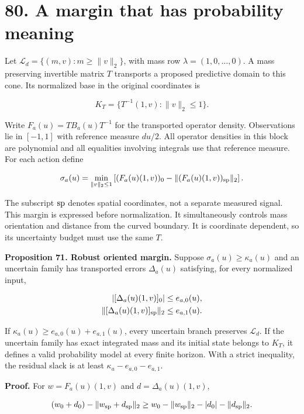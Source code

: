 \documentclass[11pt,letterpaper]{article}
\begin{document}
\section{80. A margin that has probability
meaning}\label{a-margin-that-has-probability-meaning}

Let \(\mathcal L_d=\{(m,v):m\geq\|v\|_2\}\), with mass row
\(\lambda=(1,0,\ldots,0)\). A mass preserving invertible matrix \(T\)
transports a proposed predictive domain to this cone. Its normalized
base in the original coordinates is

\[
K_T=\{T^{-1}(1,v):\|v\|_2\leq1\}.
\]

Write \(F_a(u)=TB_a(u)T^{-1}\) for the transported operator density.
Observations lie in \([-1,1]\) with reference measure \(du/2\). All
operator densities in this block are polynomial and all equalities
involving integrals use that reference measure. For each action define

\[
\sigma_a(u)=\min_{\|v\|_2\leq1}
\left[(F_a(u)(1,v))_0-\|(F_a(u)(1,v))_{\rm sp}\|_2\right].
\]

The subscript \(\rm sp\) denotes spatial coordinates, not a separate
measured signal. This margin is expressed before normalization. It
simultaneously controls mass orientation and distance from the curved
boundary. It is coordinate dependent, so its uncertainty budget must use
the same \(T\).

\textbf{Proposition 71. Robust oriented margin.} Suppose
\(\sigma_a(u)\geq\kappa_a(u)\) and an uncertain family has transported
errors \(\Delta_a(u)\) satisfying, for every normalized input,

\[
\begin{aligned}
|[\Delta_a(u)(1,v)]_0|&\leq e_{a,0}(u),\\
\|[\Delta_a(u)(1,v)]_{\rm sp}\|_2&\leq e_{a,1}(u).
\end{aligned}
\]

If \(\kappa_a(u)\geq e_{a,0}(u)+e_{a,1}(u)\), every uncertain branch
preserves \(\mathcal L_d\). If the uncertain family has exact integrated
mass and its initial state belongs to \(K_T\), it defines a valid
probability model at every finite horizon. With a strict inequality, the
residual slack is at least \(\kappa_a-e_{a,0}-e_{a,1}\).

\textbf{Proof.} For \(w=F_a(u)(1,v)\) and \(d=\Delta_a(u)(1,v)\),

\[
(w_0+d_0)-\|w_{\rm sp}+d_{\rm sp}\|_2
\geq w_0-\|w_{\rm sp}\|_2-|d_0|-\|d_{\rm sp}\|_2.
\]
\end{document}
